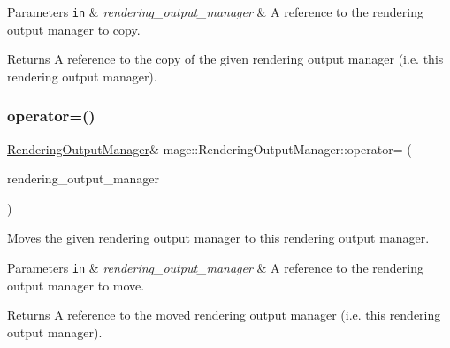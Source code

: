 \begin{DoxyParams}[1]{Parameters}
\mbox{\tt in}  & {\em rendering\+\_\+output\+\_\+manager} & A reference to the rendering output manager to copy. \\
\hline
\end{DoxyParams}
\begin{DoxyReturn}{Returns}
A reference to the copy of the given rendering output manager (i.\+e. this rendering output manager). 
\end{DoxyReturn}
\hypertarget{classmage_1_1_rendering_output_manager_a1e3ae29b6a7b888ba1cf5b93840d09d1}{}\label{classmage_1_1_rendering_output_manager_a1e3ae29b6a7b888ba1cf5b93840d09d1} 
\subsubsection{\texorpdfstring{operator=()}{operator=()}\hspace{0.1cm}{\footnotesize\ttfamily [2/2]}}
{\footnotesize\ttfamily \hyperlink{classmage_1_1_rendering_output_manager}{Rendering\+Output\+Manager}\& mage\+::\+Rendering\+Output\+Manager\+::operator= (\begin{DoxyParamCaption}\item[{\hyperlink{classmage_1_1_rendering_output_manager}{Rendering\+Output\+Manager} \&\&}]{rendering\+\_\+output\+\_\+manager }\end{DoxyParamCaption})\hspace{0.3cm}{\ttfamily [delete]}}

Moves the given rendering output manager to this rendering output manager.


\begin{DoxyParams}[1]{Parameters}
\mbox{\tt in}  & {\em rendering\+\_\+output\+\_\+manager} & A reference to the rendering output manager to move. \\
\hline
\end{DoxyParams}
\begin{DoxyReturn}{Returns}
A reference to the moved rendering output manager (i.\+e. this rendering output manager). 
\end{DoxyReturn}
\hypertarget{classmage_1_1_rendering_output_manager_a1b8102ba96cdab743499da051ca4fa3f}{}\label{classmage_1_1_rendering_output_manager_a1b8102ba96cdab743499da051ca4fa3f} 
